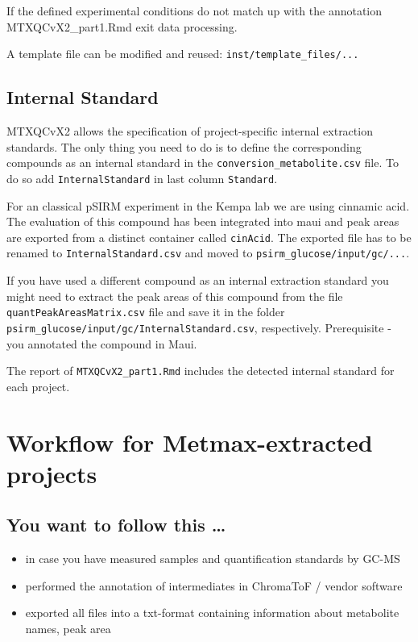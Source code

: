 \documentclass[]{book}
\providecommand{\tightlist}{%
  \setlength{\itemsep}{0pt}\setlength{\parskip}{0pt}}
\theoremstyle{definition}
\theoremstyle{definition}
\theoremstyle{definition}
\theoremstyle{remark}
\begin{document}
If the defined experimental conditions do not match up with the
annotation MTXQCvX2\_part1.Rmd exit data processing.

A template file can be modified and reused:
\texttt{inst/template\_files/...}

\section{Internal Standard}\label{internal-standard}

MTXQCvX2 allows the specification of project-specific internal
extraction standards. The only thing you need to do is to define the
corresponding compounds as an internal standard in the
\texttt{conversion\_metabolite.csv} file. To do so add
\texttt{InternalStandard} in last column \texttt{Standard}.

For an classical pSIRM experiment in the Kempa lab we are using cinnamic
acid. The evaluation of this compound has been integrated into maui and
peak areas are exported from a distinct container called
\texttt{cinAcid}. The exported file has to be renamed to
\texttt{InternalStandard.csv} and moved to
\texttt{psirm\_glucose/input/gc/...}.

If you have used a different compound as an internal extraction standard
you might need to extract the peak areas of this compound from the file
\texttt{quantPeakAreasMatrix.csv} file and save it in the folder
\texttt{psirm\_glucose/input/gc/InternalStandard.csv}, respectively.
Prerequisite - you annotated the compound in Maui.

The report of \texttt{MTXQCvX2\_part1.Rmd} includes the detected
internal standard for each project.

\chapter{Workflow for Metmax-extracted projects}\label{metmax}

\section{You want to follow this
\ldots{}}\label{you-want-to-follow-this}

\begin{itemize}
\tightlist
\item
  in case you have measured samples and quantification standards by
  GC-MS
\item
  performed the annotation of intermediates in ChromaToF / vendor
  software
\item
  exported all files into a txt-format containing information about
  metabolite names, peak area
\end{itemize}
\end{document}
